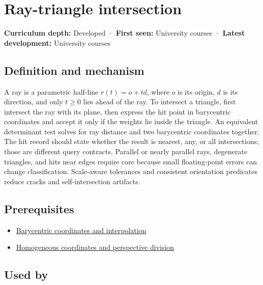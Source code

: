 \hypertarget{appendix-47ac1bd6d144}{}\label{referencestart:appendix-47ac1bd6d144}
\section{Ray-triangle intersection}\label{appendix-47ac1bd6d144-ray-triangle-intersection}

\textbf{Curriculum depth:} Developed · \textbf{First seen:} University courses · \textbf{Latest development:} University courses

\begin{allmightroledefinition}

\subsection{Definition and mechanism}\label{appendix-47ac1bd6d144-definition-and-mechanism}

A ray is a parametric half-line \(r(t)=o+td\), where \(o\) is its origin, \(d\) is its direction, and only \(t\ge0\) lies ahead of the ray. To intersect a triangle, first intersect the ray with its plane, then express the hit point in barycentric coordinates and accept it only if the weights lie inside the triangle. An equivalent determinant test solves for ray distance and two barycentric coordinates together. The hit record should state whether the result is nearest, any, or all intersections; those are different query contracts. Parallel or nearly parallel rays, degenerate triangles, and hits near edges require care because small floating-point errors can change classification. Scale-aware tolerances and consistent orientation predicates reduce cracks and self-intersection artifacts.

\end{allmightroledefinition}

\subsection{Prerequisites}\label{appendix-47ac1bd6d144-prerequisites}

\begin{itemize}
\tightlist
\item
  \hyperref[appendix-02b9d9a81dca]{Barycentric coordinates and interpolation}
\item
  \hyperref[appendix-cb3b26862282]{Homogeneous coordinates and perspective division}
\end{itemize}

\subsection{Used by}\label{appendix-47ac1bd6d144-used-by}

